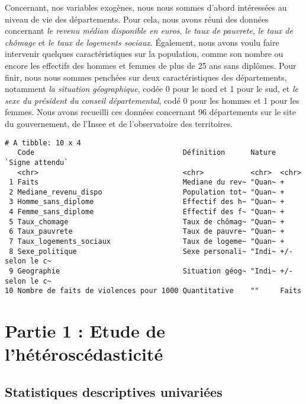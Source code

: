 \documentclass[
]{article}
\begin{document}
Concernant, nos variables exogènes, nous nous sommes d'abord intéressées
au niveau de vie des départements. Pour cela, nous avons réuni des
données concernant \emph{le revenu médian disponible en euros}, \emph{le
taux de pauvrete}, \emph{le taux de chômage} et \emph{le taux de
logements sociaux}. Également, nous avons voulu faire intervenir
quelques caractéristiques sur la population, comme son nombre ou encore
les effectifs des hommes et femmes de plus de 25 ans sans diplômes. Pour
finir, nous nous sommes penchées sur deux caractéristiques des
départements, notamment \emph{la situation géographique}, codée 0 pour
le nord et 1 pour le sud, et \emph{le sexe du président du conseil
départemental}, codé 0 pour les hommes et 1 pour les femmes. Nous avons
recueilli ces données concernant 96 départements sur le site du
gouvernement, de l'Insee et de l'observatoire des territoires.

\begin{verbatim}
# A tibble: 10 x 4
   Code                                   Définition      Nature `Signe attendu`
   <chr>                                  <chr>           <chr>  <chr>          
 1 Faits                                  Mediane du rev~ "Quan~ +              
 2 Mediane_revenu_dispo                   Population tot~ "Quan~ +              
 3 Homme_sans_diplome                     Effectif des h~ "Quan~ +              
 4 Femme_sans_diplome                     Effectif des f~ "Quan~ +              
 5 Taux_chomage                           Taux de chômag~ "Quan~ +              
 6 Taux_pauvrete                          Taux de pauvre~ "Quan~ +              
 7 Taux_logements_sociaux                 Taux de logeme~ "Quan~ +              
 8 Sexe_politique                         Sexe personali~ "Indi~ +/- selon le c~
 9 Geographie                             Situation géog~ "Indi~ +/- selon le c~
10 Nombre de faits de violences pour 1000 Quantitative    ""     Faits          
\end{verbatim}

\hypertarget{partie-1-etude-de-lhuxe9tuxe9roscuxe9dasticituxe9}{%
\section{Partie 1 : Etude de
l'hétéroscédasticité}\label{partie-1-etude-de-lhuxe9tuxe9roscuxe9dasticituxe9}}

\hypertarget{statistiques-descriptives-univariuxe9es}{%
\subsection{Statistiques descriptives
univariées}\label{statistiques-descriptives-univariuxe9es}}
\end{document}

